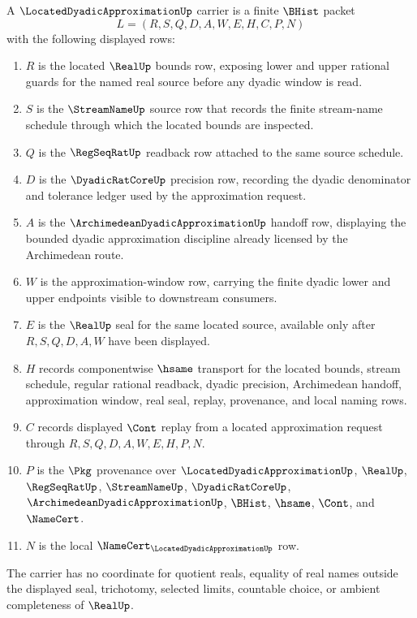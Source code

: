 \begin{definition}
\label{def:located-dyadic-approximation-carrier}
A $\LocatedDyadicApproximationUp$ carrier is a finite $\BHist$ packet
$$
L=(R,S,Q,D,A,W,E,H,C,P,N)
$$
with the following displayed rows:
\begin{enumerate}
\item $R$ is the located $\RealUp$ bounds row, exposing lower and upper rational guards for the named real source before any dyadic window is read.
\item $S$ is the $\StreamNameUp$ source row that records the finite stream-name schedule through which the located bounds are inspected.
\item $Q$ is the $\RegSeqRatUp$ readback row attached to the same source schedule.
\item $D$ is the $\DyadicRatCoreUp$ precision row, recording the dyadic denominator and tolerance ledger used by the approximation request.
\item $A$ is the $\ArchimedeanDyadicApproximationUp$ handoff row, displaying the bounded dyadic approximation discipline already licensed by the Archimedean route.
\item $W$ is the approximation-window row, carrying the finite dyadic lower and upper endpoints visible to downstream consumers.
\item $E$ is the $\RealUp$ seal for the same located source, available only after $R,S,Q,D,A,W$ have been displayed.
\item $H$ records componentwise $\hsame$ transport for the located bounds, stream schedule, regular rational readback, dyadic precision, Archimedean handoff, approximation window, real seal, replay, provenance, and local naming rows.
\item $C$ records displayed $\Cont$ replay from a located approximation request through $R,S,Q,D,A,W,E,H,P,N$.
\item $P$ is the $\Pkg$ provenance over $\LocatedDyadicApproximationUp$, $\RealUp$, $\RegSeqRatUp$, $\StreamNameUp$, $\DyadicRatCoreUp$, $\ArchimedeanDyadicApproximationUp$, $\BHist$, $\hsame$, $\Cont$, and $\NameCert$.
\item $N$ is the local $\NameCert_{\LocatedDyadicApproximationUp}$ row.
\end{enumerate}
The carrier has no coordinate for quotient reals, equality of real names outside the displayed seal, trichotomy, selected limits, countable choice, or ambient completeness of $\RealUp$.
\end{definition}


